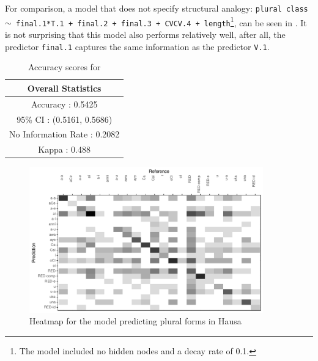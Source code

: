 For comparison, a model that does not specify structural analogy: \texttt{plural class $\sim$ final.1*T.1 + final.2 + final.3 + CVCV.4 + length}\footnote{The model included no hidden nodes and a decay rate of 0.1.}, can be seen in . It is not surprising that this model also performs relatively well, after all, the predictor \texttt{final.1} captures the same information as the predictor \texttt{V.1}.
\largerpage[2]
\begin{table}%
  \centering
  \begin{tabular}{rl}
    \toprule
    \multicolumn{2}{c}{Overall Statistics}                                         \\
    \midrule
    \multicolumn{2}{c}{Accuracy : 0.5425}                                          \\
    \multicolumn{2}{c}{95\% CI : (0.5161, 0.5686)}                                  \\
    \multicolumn{2}{c}{No Information Rate : 0.2082}                               \\
    \multicolumn{2}{c}{Kappa : 0.488}                                             \\
    \bottomrule
  \end{tabular}
  \caption{Accuracy scores for }\label{tab:class-hausa-stats}
\end{table}

\clearpage
\begin{figure}%
  \includegraphics[width=0.9\textwidth]{./figures/hausa/plurals-cm.pdf}
  \caption{Heatmap for the model predicting plural forms in Hausa}\label{fig:class-hausa-cm}
\end{figure}


